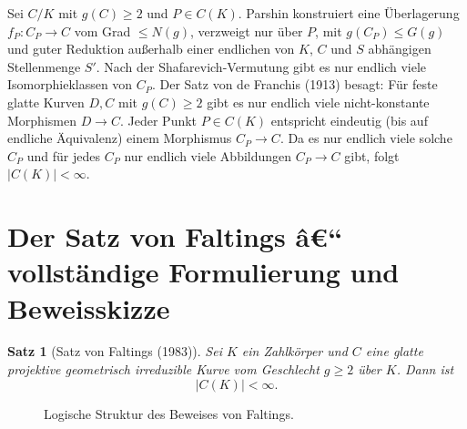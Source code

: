 ﻿\documentclass[12pt,a4paper]{article}
\theoremstyle{plain}
\newtheorem{theorem}{Satz}[section]
\theoremstyle{definition}
\theoremstyle{remark}
\newenvironment{proof*}[1][Beweis]{%
  \begin{proof}[#1]\renewcommand{\qedsymbol}{$\blacksquare$}}
  {\end{proof}}
\begin{document}
\begin{proof*}
Sei $C/K$ mit $g(C) \geq 2$ und $P \in C(K)$.
Parshin konstruiert eine Überlagerung $f_P: C_P \to C$ vom Grad $\leq N(g)$,
verzweigt nur über $P$, mit $g(C_P) \leq G(g)$ und
guter Reduktion außerhalb einer endlichen von $K$, $C$ und $S$
abhängigen Stellenmenge $S'$.
Nach der Shafarevich-Vermutung gibt es nur endlich viele Isomorphieklassen von $C_P$.
Der Satz von de Franchis (1913) besagt: Für feste glatte Kurven $D, C$ mit $g(C) \geq 2$
gibt es nur endlich viele nicht-konstante Morphismen $D \to C$.
Jeder Punkt $P \in C(K)$ entspricht eindeutig (bis auf endliche Äquivalenz)
einem Morphismus $C_P \to C$. Da es nur endlich viele solche $C_P$ und
für jedes $C_P$ nur endlich viele Abbildungen $C_P \to C$ gibt,
folgt $|C(K)| < \infty$.
\end{proof*}

\section{Der Satz von Faltings â€“ vollständige Formulierung und Beweisskizze}

\begin{theorem}[Satz von Faltings (1983)]\label{thm:faltings}
Sei $K$ ein Zahlkörper und $C$ eine glatte projektive geometrisch irreduzible Kurve
vom Geschlecht $g \geq 2$ über $K$. Dann ist
\[
  \boxed{|C(K)| < \infty.}
\]
\end{theorem}

\begin{figure}[H]
\centering
{}
\caption{Logische Struktur des Beweises von Faltings.}
\label{fig:beweis_struktur}
\end{figure}
\end{document}
